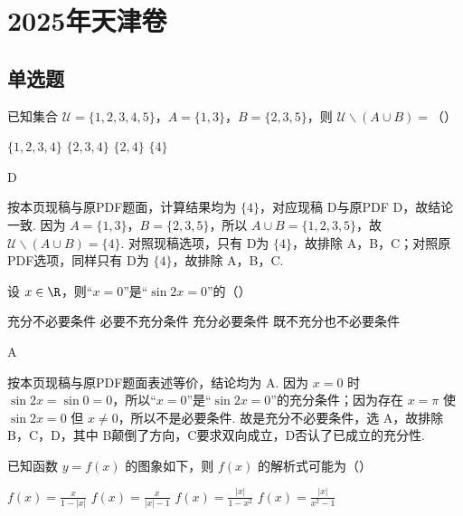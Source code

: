 \documentclass[UTF8,a4paper,oneside,11pt]{ctexbook}
\begin{document}
\mainmatter

\chapter{2025年天津卷}

\section{单选题}

\begin{problem}
已知集合 \(\mathcal U=\{1,2,3,4,5\}\)，\(A=\{1,3\}\)，\(B=\{2,3,5\}\)，则 \(\mathcal U\smallsetminus(A\cup B)=\)（\quad）

\choices
    {\(\{1,2,3,4\}\)}
    {\(\{2,3,4\}\)}
    {\(\{2,4\}\)}
    {\(\{4\}\)}
\end{problem}

\begin{answer}
D
\end{answer}

\begin{solution}
按本页现稿与原PDF题面，计算结果均为 \(\{4\}\)，对应现稿 D与原PDF D，故结论一致. 因为 \(A=\{1,3\}\)，\(B=\{2,3,5\}\)，所以 \(A\cup B=\{1,2,3,5\}\)，故 \(\mathcal U\smallsetminus\left( A\cup B \right)=\{4\}\). 对照现稿选项，只有 D为 \(\{4\}\)，故排除 A，B，C；对照原PDF选项，同样只有 D为 \(\{4\}\)，故排除 A，B，C.
\end{solution}

\begin{problem}
设 \(x\in\R\)，则“\(x=0\)”是“\(\sin 2x=0\)”的（\quad）

\choices
    {充分不必要条件}
    {必要不充分条件}
    {充分必要条件}
    {既不充分也不必要条件}
\end{problem}

\begin{answer}
A
\end{answer}

\begin{solution}
按本页现稿与原PDF题面表述等价，结论均为 A. 因为 \(x=0\) 时 \(\sin 2x=\sin 0=0\)，所以“\(x=0\)”是“\(\sin 2x=0\)”的充分条件；因为存在 \(x=\pi\) 使 \(\sin 2x=0\) 但 \(x\ne 0\)，所以不是必要条件. 故是充分不必要条件，选 A，故排除 B，C，D，其中 B颠倒了方向，C要求双向成立，D否认了已成立的充分性.
\end{solution}

\begin{problem}
已知函数 \(y=f(x)\) 的图象如下，则 \(f(x)\) 的解析式可能为（\quad）


\choices
    {\(f(x)=\frac{x}{1-|x|}\)}
    {\(f(x)=\frac{x}{|x|-1}\)}
    {\(f(x)=\frac{|x|}{1-x^2}\)}
    {\(f(x)=\frac{|x|}{x^2-1}\)}
\end{problem}
\end{document}
